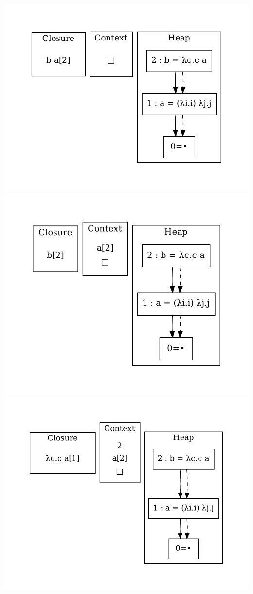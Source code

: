 \includegraphics[width=\linewidth/2]{figures/5.pdf}
\includegraphics[width=\linewidth/2]{figures/6.pdf}
\includegraphics[width=\linewidth/2]{figures/7.pdf}
